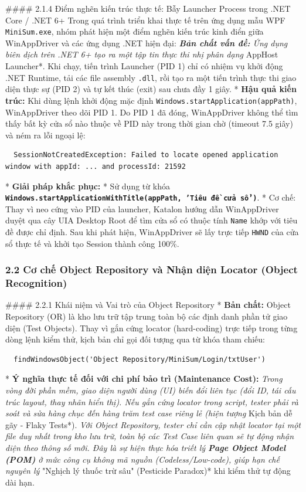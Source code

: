 #### 2.1.4 Điểm nghẽn kiến trúc thực tế: Bẫy Launcher Process trong .NET Core / .NET 6+
Trong quá trình triển khai thực tế trên ứng dụng mẫu WPF \texttt{MiniSum.exe}, nhóm phát hiện một điểm nghẽn kiến trúc kinh điển giữa WinAppDriver và các ứng dụng .NET hiện đại:
\textit{ \textbf{Bản chất vấn đề:} Ứng dụng biên dịch trên .NET 6+ tạo ra một tập tin thực thi nhị phân dạng }AppHost Launcher*. Khi chạy, tiến trình Launcher (PID 1) chỉ có nhiệm vụ khởi động .NET Runtime, tải các file assembly \texttt{.dll}, rồi tạo ra một tiến trình thực thi giao diện thực sự (PID 2) và tự kết thúc (exit) sau chưa đầy 1 giây.
* \textbf{Hậu quả kiến trúc:} Khi dùng lệnh khởi động mặc định \texttt{Windows.startApplication(appPath)}, WinAppDriver theo dõi PID 1. Do PID 1 đã đóng, WinAppDriver không thể tìm thấy bất kỳ cửa sổ nào thuộc về PID này trong thời gian chờ (timeout 7.5 giây) và ném ra lỗi ngoại lệ:
\begin{lstlisting}
  SessionNotCreatedException: Failed to locate opened application window with appId: ... and processId: 21592
\end{lstlisting}

* \textbf{Giải pháp khắc phục:} 
  * Sử dụng từ khóa \textbf{\texttt{Windows.startApplicationWithTitle(appPath, 'Tiêu đề cửa sổ')}}. 
  * Cơ chế: Thay vì neo cứng vào PID của launcher, Katalon hướng dẫn WinAppDriver duyệt qua cây UIA Desktop Root để tìm cửa sổ có thuộc tính \texttt{Name} khớp với tiêu đề được chỉ định. Sau khi phát hiện, WinAppDriver sẽ lấy trực tiếp \texttt{HWND} của cửa sổ thực tế và khởi tạo Session thành công 100\%.

\subsubsection{2.2 Cơ chế Object Repository và Nhận diện Locator (Object Recognition)}

#### 2.2.1 Khái niệm và Vai trò của Object Repository
* \textbf{Bản chất:} Object Repository (OR) là kho lưu trữ tập trung toàn bộ các định danh phần tử giao diện (Test Objects). Thay vì gắn cứng locator (hard-coding) trực tiếp trong từng dòng lệnh kiểm thử, kịch bản chỉ gọi đối tượng qua từ khóa tham chiếu:
\begin{lstlisting}
  findWindowsObject('Object Repository/MiniSum/Login/txtUser')
\end{lstlisting}

* \textbf{Ý nghĩa thực tế đối với chi phí bảo trì (Maintenance Cost):}
  \textit{ Trong vòng đời phần mềm, giao diện người dùng (UI) biến đổi liên tục (đổi ID, tái cấu trúc layout, thay nhãn hiển thị). Nếu gắn cứng locator trong script, tester phải rà soát và sửa hàng chục đến hàng trăm test case riêng lẻ (hiện tượng }Kịch bản dễ gãy - Flaky Tests*).
  \textit{ Với Object Repository, tester chỉ cần cập nhật locator tại một file duy nhất trong kho lưu trữ, toàn bộ các Test Case liên quan sẽ tự động nhận diện theo thông số mới. Đây là sự hiện thực hóa triết lý \textbf{Page Object Model (POM)} ở mức công cụ không mã nguồn (Codeless/Low-code), giúp hạn chế nguyên lý }"Nghịch lý thuốc trừ sâu" (Pesticide Paradox)* khi kiểm thử tự động dài hạn.

